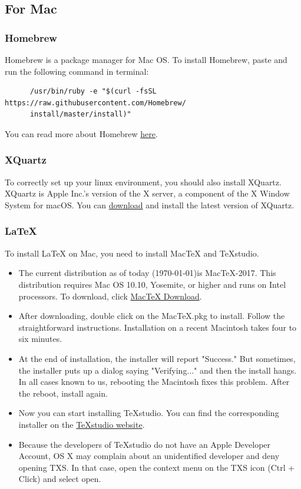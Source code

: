 \documentclass[11pt]{article} %
\begin{document}
  \subsection{For Mac}
  
    \subsubsection{Homebrew}
    
      Homebrew is a package manager for Mac OS. 
      To install Homebrew, paste and run the following command in terminal:
      \begin{lstlisting}
      /usr/bin/ruby -e "$(curl -fsSL https://raw.githubusercontent.com/Homebrew/
      install/master/install)"
      \end{lstlisting}
      You can read more about Homebrew \href{https://brew.sh/}{here}. 
      
    \subsubsection{XQuartz}
    
      To correctly set up your linux environment, you should also install XQuartz. 
      XQuartz is Apple Inc.'s version of the X server, a component of the X Window System for macOS. 
      You can \href{https://www.xquartz.org/}{download} and install the latest version of XQuartz. 
      
    \subsubsection{LaTeX}
    
      To install LaTeX on Mac, you need to install MacTeX and TeXstudio. 
      \begin{itemize}
        \item The current distribution as of today (\today)is MacTeX-2017. 
        This distribution requires Mac OS 10.10, Yosemite, or higher and runs on Intel processors. 
        To download, click \href{http://www.tug.org/mactex/mactex-download.html}{MacTeX Download}. 
        \item After downloading, double click on the MacTeX.pkg to install. 
        Follow the straightforward instructions. 
        Installation on a recent Macintosh takes four to six minutes. 
        \item At the end of installation, the installer will report "Success." But sometimes, the installer puts up a dialog saying "Verifying..." and then the install hangs. 
        In all cases known to us, rebooting the Macintosh fixes this problem. 
        After the reboot, install again. 
        \item Now you can start installing TeXstudio. 
        You can find the corresponding installer on the \href{https://www.texstudio.org/}{TeXstudio website}. 
        \item Because the developers of TeXstudio do not have an Apple Developer Account, OS X may complain about an unidentified developer and deny opening TXS. 
        In that case, open the context menu on the TXS icon (Ctrl + Click) and select open. 
      \end{itemize} 
    
\end{document}
